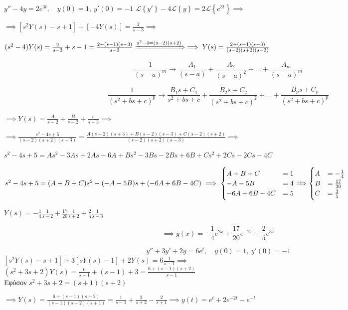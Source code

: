 \documentclass[11pt,a4paper,titlepage,final]{article}
\begin{document}
\begin{exercise*}{12.5}
	\( y''-4y=2e^{3t},\quad y(0)=1,\ y'(0)=-1 \)
	\tcblower
	\( \mathscr L \left\lbrace y' \right\rbrace -4\mathscr L \left\lbrace y \right\rbrace = 2 \mathscr L\left\lbrace e^{3t} \right\rbrace \implies \)

	\( \implies \left[
	s^2Y(s)-s+1
	\right] + \left[-4Y(s)\right] = \frac{2}{s-3} \implies \)

	\( (s^2-4)Y(s) = \frac{2}{s-3}+s-1=\frac{2+(s-1)(s-3)}{s-3} \xRightarrow{s^2-4=(s-2)(s+2)} \implies Y(s) = \frac{2+(s-1)(s-3)}{(s-2)(s+2)(s-3)} \)

	\begin{attnbox}{}
		\[
		\frac{1}{(s-a)^m} \rightarrow \frac{A_1}{(s-a)}+\frac{A_2}{(s-a)^2}+\dots + \frac{A_m}{(s-a)^m}
		\]

		\[
		\frac{1}{(s^2+bs+c)^p} \rightarrow
		\frac{B_1s+C_1}{s^2+bs+c} + \frac{B_2s+C_2}{(s^2+bs+c)^2} + \dots + \frac{B_ps+C_p}{(s^2+bs+c)^p}
		\]
	\end{attnbox}

	\( \implies Y(s) = \frac{A}{s-2}+\frac{B}{s+2} + \frac{c}{s-3} \implies  \)

	\( \implies \frac{s^2-4s+5}{(s-2)(s+2)(s-3)} = \frac{A(s+2)(s+3)+B(s-2)(s-3)+C(s-2)(s+2)}{(s-2)(s+2)(s-3)} \implies \)

	\( s^2-4s+5 = As^2-3As+2As-6A +Bs^2-3Bs-2Bs+6B+Cs^2+2Cs-2Cs-4C \)

	\( s^2-4s+5 = (A+B+C)s^2 - (-A-5B)s + (-6A+6B-4C) \implies \begin{cases}
	A+B+C &= 1 \\
	-A-5B &= 4 \\
	-6A +6B -4C &= 5
	\end{cases} \xRightarrow{\dots} \begin{cases}
	A &= -\frac{1}{4} \\
	B &= \frac{17}{30} \\
	C &= \frac{3}{5}
	\end{cases} \)

	\( Y(s) = -\frac{1}{4}\frac{1}{s-2} + \frac{17}{20} \frac{1}{s+2} + \frac{2}{5}\frac{1}{s-3} \)

	\[ \implies \boxed{ y(x) = -\frac{1}{4}e^{2x}+\frac{17}{20}e^{-2x}+\frac{2}{5}e^{3x}} \]
\end{exercise*}

\begin{exercise*}{12.6}
	\[
	y''+3y'+2y=6e^t,\quad y(0) = 1,\ y'(0) = -1
	\]
	\tcblower
	\( \left[s^2Y(s)-s+1\right] +3\left[sY(s)-1\right]+2Y(s) = 6\frac{1}{s-1}
	\implies \) \\
	\( (s^2+3s+2)Y(s) = \frac{6}{s-1}+(s-1)+3 = \frac{6+(s-1)(s+2)}{s-1} \) \\
	Εφόσον \( s^2+3s+2=(s+1)(s+2) \)

	\( \implies Y(s) = \frac{6+(s-1)(s+2)}{(s-1)(s+2)(s+1)}
	= \frac{1}{s-1}+\frac{2}{s+2}-\frac{2}{s+1}
	\implies \boxed{ y(t) = e^t+2e^{-2t}-e^{-t} }
	\)
\end{exercise*}
\end{document}

